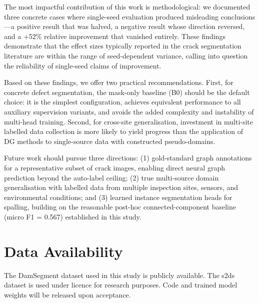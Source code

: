 \documentclass[preprint,12pt]{elsarticle}
\begin{document}
The most impactful contribution of this work is methodological: we documented three concrete cases where single-seed evaluation produced misleading conclusions---a positive result that was halved, a negative result whose direction reversed, and a +52\% relative improvement that vanished entirely. These findings demonstrate that the effect sizes typically reported in the crack segmentation literature are within the range of seed-dependent variance, calling into question the reliability of single-seed claims of improvement.

Based on these findings, we offer two practical recommendations. First, for concrete defect segmentation, the mask-only baseline (B0) should be the default choice: it is the simplest configuration, achieves equivalent performance to all auxiliary supervision variants, and avoids the added complexity and instability of multi-head training. Second, for cross-site generalisation, investment in multi-site labelled data collection is more likely to yield progress than the application of DG methods to single-source data with constructed pseudo-domains.

Future work should pursue three directions: (1) gold-standard graph annotations for a representative subset of crack images, enabling direct neural graph prediction beyond the auto-label ceiling; (2) true multi-source domain generalisation with labelled data from multiple inspection sites, sensors, and environmental conditions; and (3) learned instance segmentation heads for spalling, building on the reasonable post-hoc connected-component baseline (micro F1 = 0.567) established in this study.



\section*{Data Availability}

The DamSegment dataset used in this study is publicly available. The s2ds dataset is used under licence for research purposes. Code and trained model weights will be released upon acceptance.





\end{document}

